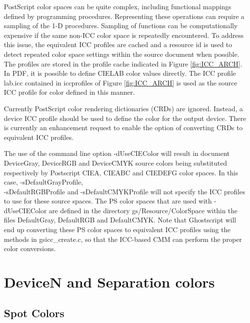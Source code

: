 \documentclass[12pt,notitlepage]{article}
\begin{document}
PostScript color spaces can be quite complex, including functional mappings defined by programming procedures.  Representing these operations can require a sampling of the 1-D procedures.  Sampling of functions can be computationally expensive if the same non-ICC color space is repeatedly encountered.  To address this issue, the equivalent ICC profiles are cached and a resource id is used to detect repeated color space settings within the source document when possible.
The profiles are stored in the profile cache indicated in Figure \ref{fig:ICC_ARCH}.  In PDF, it is possible to define CIELAB color values directly.  The ICC profile lab.icc contained in iccprofiles of Figure \ref{fig:ICC_ARCH} is used as the source ICC profile for color defined in this manner.

Currently PostScript color rendering dictionaries (CRDs) are ignored.  Instead, a device ICC profile should be used to define the color for the output device.  There is currently an enhancement request to enable the option of converting CRDs to equivalent ICC profiles.

The use of the command line option -dUseCIEColor will result in document DeviceGray, DeviceRGB and DeviceCMYK source colors being substituted respectively by Postscript CIEA, CIEABC and CIEDEFG color spaces.  In this case, -sDefaultGrayProfile, \\
-sDefaultRGBProfile and -sDefaultCMYKProfile will not specify the ICC profiles to use for these source spaces.   The PS color spaces that are used with -dUseCIEColor are defined in the directory
gs/Resource/ColorSpace within the files DefaultGray, DefaultRGB and DefaultCMYK.   Note that Ghostscript will end up converting these PS color spaces to equivalent ICC profiles using the methods in gsicc\_create.c, so that the ICC-based CMM can perform the proper color conversions.

\section{DeviceN and Separation colors}

\subsection{Spot Colors}
\end{document}
